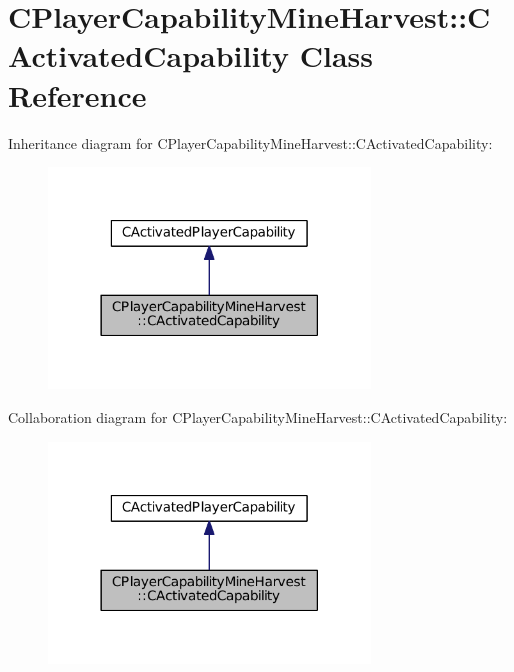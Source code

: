 \hypertarget{classCPlayerCapabilityMineHarvest_1_1CActivatedCapability}{}\section{C\+Player\+Capability\+Mine\+Harvest\+:\+:C\+Activated\+Capability Class Reference}
\label{classCPlayerCapabilityMineHarvest_1_1CActivatedCapability}


Inheritance diagram for C\+Player\+Capability\+Mine\+Harvest\+:\+:C\+Activated\+Capability\+:\nopagebreak
\begin{figure}[H]
\begin{center}
\leavevmode
\includegraphics[width=242pt]{classCPlayerCapabilityMineHarvest_1_1CActivatedCapability__inherit__graph}
\end{center}
\end{figure}


Collaboration diagram for C\+Player\+Capability\+Mine\+Harvest\+:\+:C\+Activated\+Capability\+:\nopagebreak
\begin{figure}[H]
\begin{center}
\leavevmode
\includegraphics[width=242pt]{classCPlayerCapabilityMineHarvest_1_1CActivatedCapability__coll__graph}
\end{center}
\end{figure}
